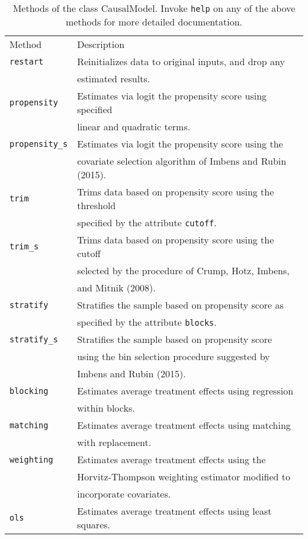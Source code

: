 \documentclass[12pt]{article}
\theoremstyle{definition}
\theoremstyle{definition}
\theoremstyle{definition}
\theoremstyle{remark}
\begin{document}
\begin{table}[h]
\begin{center}\begin{tabular}{ll}
Method & Description \\
\texttt{restart} & Reinitializes data to original inputs, and drop any \\
& estimated results. \\
\texttt{propensity} & Estimates via logit the propensity score using specified \\
& linear and quadratic terms. \\
\texttt{propensity\_s} & Estimates via logit the propensity score using the \\
& covariate selection algorithm of Imbens and Rubin (2015). \\
\texttt{trim} & Trims data based on propensity score using the threshold \\
& specified by the attribute \texttt{cutoff}. \\
\texttt{trim\_s} & Trims data based on propensity score using the cutoff \\
& selected by the procedure of Crump, Hotz, Imbens, \\
& and Mitnik (2008). \\
\texttt{stratify} & Stratifies the sample based on propensity score as \\
& specified by the attribute \texttt{blocks}. \\
\texttt{stratify\_s} & Stratifies the sample based on propensity score \\
& using the bin selection procedure suggested by \\
& Imbens and Rubin (2015). \\
\texttt{blocking} & Estimates average treatment effects using regression \\
& within blocks. \\
\texttt{matching} & Estimates average treatment effects using matching \\
& with replacement. \\
\texttt{weighting} & Estimates average treatment effects using the \\
& Horvitz-Thompson weighting estimator modified to \\
& incorporate covariates. \\
\texttt{ols} & Estimates average treatment effects using least squares.
\end{tabular}\end{center}
\caption{Methods of the class CausalModel. Invoke \texttt{help} on any of the above methods for more detailed documentation.}  \label{tab.b}
\end{table}
\end{document}
